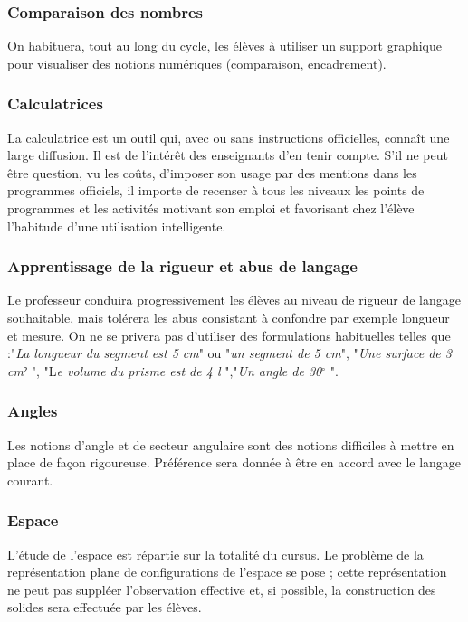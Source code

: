 \subsubsection*{Comparaison des nombres}
On habituera, tout au long du cycle, les élèves à utiliser un support graphique pour visualiser des notions numériques (comparaison, encadrement).
\subsubsection*{Calculatrices}
La calculatrice est un outil qui, avec ou sans instructions officielles, connaît une large diffusion. Il est de l'intérêt des enseignants d'en tenir compte. S'il ne peut
être question, vu les coûts, d'imposer son usage par des mentions dans les programmes officiels, il importe de recenser à tous les niveaux les points de programmes et les
activités motivant son emploi et favorisant chez l'élève l'habitude d'une utilisation intelligente.
\subsubsection*{Apprentissage de la rigueur et abus de langage}
Le professeur conduira progressivement les élèves au niveau de rigueur de langage souhaitable, mais tolérera les abus consistant à confondre par exemple
longueur et mesure. On ne se privera pas d'utiliser des formulations habituelles telles que :"\textit{La longueur du segment est 5 cm}" ou "\textit{un segment de 5 cm}", "\textit{Une surface de 3 cm$²$} ", "L\textit{e volume du prisme est de 4 l} ","\textit{Un angle de 30$^{\circ}$} ".
\subsubsection*{Angles}
Les notions d'angle et de secteur angulaire sont des notions difficiles à mettre en place de façon rigoureuse. Préférence sera donnée à être en accord avec le langage courant.
\subsubsection*{Espace}
L'étude de l'espace est répartie sur la totalité du cursus. Le problème de la représentation plane de configurations de l'espace se pose ; cette représentation ne
peut pas suppléer l'observation effective et, si possible, la construction des solides sera effectuée par les élèves.
